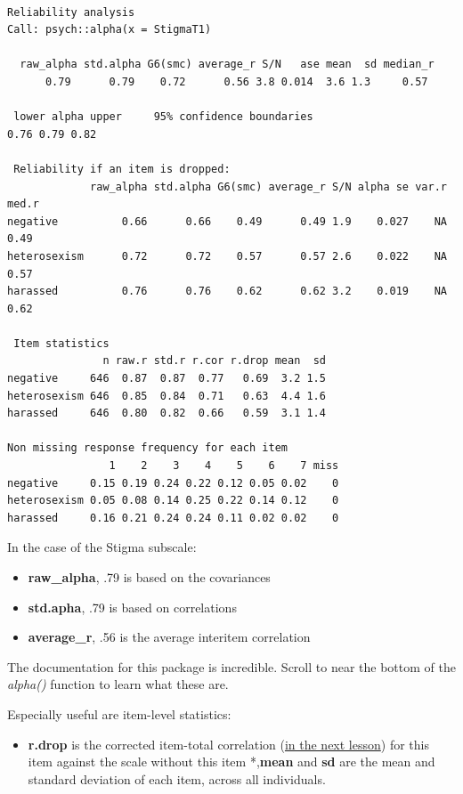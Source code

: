 \documentclass[
  english,
]{book}
\providecommand{\tightlist}{%
  \setlength{\itemsep}{0pt}\setlength{\parskip}{0pt}}
\begin{document}
\begin{verbatim}

Reliability analysis   
Call: psych::alpha(x = StigmaT1)

  raw_alpha std.alpha G6(smc) average_r S/N   ase mean  sd median_r
      0.79      0.79    0.72      0.56 3.8 0.014  3.6 1.3     0.57

 lower alpha upper     95% confidence boundaries
0.76 0.79 0.82 

 Reliability if an item is dropped:
             raw_alpha std.alpha G6(smc) average_r S/N alpha se var.r med.r
negative          0.66      0.66    0.49      0.49 1.9    0.027    NA  0.49
heterosexism      0.72      0.72    0.57      0.57 2.6    0.022    NA  0.57
harassed          0.76      0.76    0.62      0.62 3.2    0.019    NA  0.62

 Item statistics 
               n raw.r std.r r.cor r.drop mean  sd
negative     646  0.87  0.87  0.77   0.69  3.2 1.5
heterosexism 646  0.85  0.84  0.71   0.63  4.4 1.6
harassed     646  0.80  0.82  0.66   0.59  3.1 1.4

Non missing response frequency for each item
                1    2    3    4    5    6    7 miss
negative     0.15 0.19 0.24 0.22 0.12 0.05 0.02    0
heterosexism 0.05 0.08 0.14 0.25 0.22 0.14 0.12    0
harassed     0.16 0.21 0.24 0.24 0.11 0.02 0.02    0
\end{verbatim}

In the case of the Stigma subscale:

\begin{itemize}
\tightlist
\item
  \textbf{raw\_alpha}, .79 is based on the covariances
\item
  \textbf{std.apha}, .79 is based on correlations
\item
  \textbf{average\_r}, .56 is the average interitem correlation
\end{itemize}

The documentation for this package is incredible. Scroll to near the bottom of the \emph{alpha()} function to learn what these are.

Especially useful are item-level statistics:

\begin{itemize}
\tightlist
\item
  \textbf{r.drop} is the corrected item-total correlation (\protect\hyperlink{ItemAnalSurvey}{in the next lesson}) for this item against the scale without this item
  *,\textbf{mean} and \textbf{sd} are the mean and standard deviation of each item, across all individuals.
\end{itemize}
\end{document}
